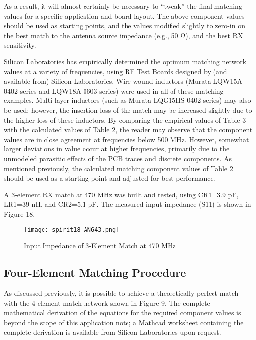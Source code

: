         As a result, it will almost certainly be necessary to “tweak” the final matching values for a 
        specific application and board layout. The above component values should be used as starting points, 
        and the values modified slightly to zero-in on the best match to the antenna source impedance (e.g., 
        50 Ω), and the best RX sensitivity.
        
        Silicon Laboratories has empirically determined the optimum matching network values at a variety of 
        frequencies, using RF Test Boards designed by (and available from) Silicon Laboratories. Wire-wound 
        inductors (Murata LQW15A 0402-series and LQW18A 0603-series) were used in all of these matching 
        examples. Multi-layer inductors (such as Murata LQG15HS 0402-series) may also be used; however, the 
        insertion loss of the match may be increased slightly due to the higher loss of these inductors. By 
        comparing the empirical values of Table 3 with the calculated values of Table 2, the reader may 
        observe that the component values are in close agreement at frequencies below 500 MHz. However, 
        somewhat larger deviations in value occur at higher frequencies, primarily due to the unmodeled 
        parasitic effects of the PCB traces and discrete components. As mentioned previously, the calculated 
        matching component values of Table 2 should be used as a starting point and adjusted for best 
        performance.
        
        A 3-element RX match at 470 MHz was built and tested, using CR1=3.9 pF, LR1=39 nH, and CR2=5.1 pF. 
        The measured input impedance (S11) is shown in Figure 18.
        
        \begin{figure}[ht!] %
          \centering
          \texttt{[image: spirit18\_AN643.png]}
          \caption{Input Impedance of 3-Element Match at 470 MHz}
          \label{EXP001:fig_spirit18}
        \end{figure}
        
      \subsection{Four-Element Matching Procedure}
        As discussed previously, it is possible to achieve a theoretically-perfect match with the 4-element 
        match network shown in Figure 9. The complete mathematical derivation of the equations for the 
        required component values is beyond the scope of this application note; a Mathcad worksheet 
        containing the complete derivation is available from Silicon Laboratories upon request.
        

